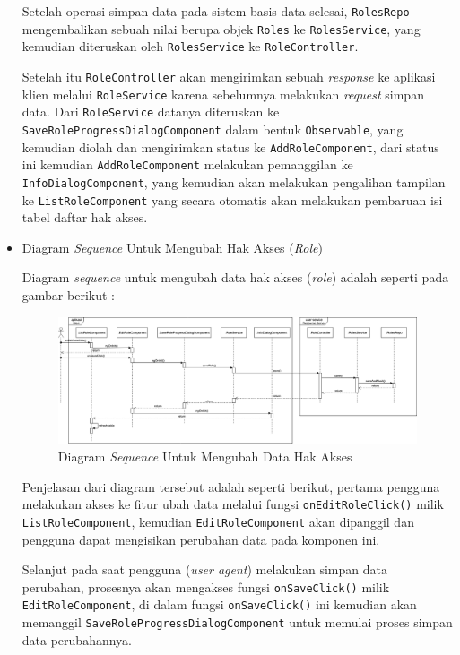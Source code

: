\documentclass[pdftex,12pt, oneside]{article}
\begin{document}
\begin{itemize}
	Setelah operasi simpan data pada sistem basis data selesai, \texttt{RolesRepo} mengembalikan sebuah nilai berupa objek \texttt{Roles} ke \texttt{RolesService}, yang kemudian diteruskan oleh \texttt{RolesService} ke \texttt{RoleController}.
	
	Setelah itu \texttt{RoleController} akan mengirimkan sebuah \textit{response} ke aplikasi klien melalui \texttt{RoleService} karena sebelumnya melakukan \textit{request} simpan data. Dari \texttt{RoleService} datanya diteruskan ke \texttt{SaveRoleProgressDialogComponent} dalam bentuk \texttt{Observable}, yang kemudian diolah dan mengirimkan status ke \texttt{AddRoleComponent}, dari status ini kemudian \texttt{AddRoleComponent} melakukan pemanggilan ke \texttt{InfoDialogComponent}, yang kemudian akan melakukan pengalihan tampilan ke \texttt{ListRoleComponent} yang secara otomatis akan melakukan pembaruan isi tabel daftar hak akses.
	
	\item Diagram \textit{Sequence} Untuk Mengubah Hak Akses (\textit{Role})
	
	Diagram \textit{sequence} untuk mengubah data hak akses (\textit{role}) adalah seperti pada gambar berikut :
	
	\begin{figure}[H]
		\centering
		\includegraphics[width=1\textwidth]{./resources/seq-edit-role}
		\caption{Diagram \textit{Sequence} Untuk Mengubah Data Hak Akses}
		\label{fig:seq-edit-role}
	\end{figure}
	
	Penjelasan dari diagram tersebut adalah seperti berikut, pertama pengguna melakukan akses ke fitur ubah data melalui fungsi \texttt{onEditRoleClick()} milik \texttt{ListRoleComponent}, kemudian \texttt{EditRoleComponent} akan dipanggil dan pengguna dapat mengisikan perubahan data pada komponen ini.
	
	Selanjut pada saat pengguna (\textit{user agent}) melakukan simpan data perubahan, prosesnya akan mengakses fungsi \texttt{onSaveClick()} milik \texttt{EditRoleComponent}, di dalam fungsi \texttt{onSaveClick()} ini kemudian akan memanggil \texttt{SaveRoleProgressDialogComponent} untuk memulai proses simpan data perubahannya.
	

\end{itemize}
\end{document}
